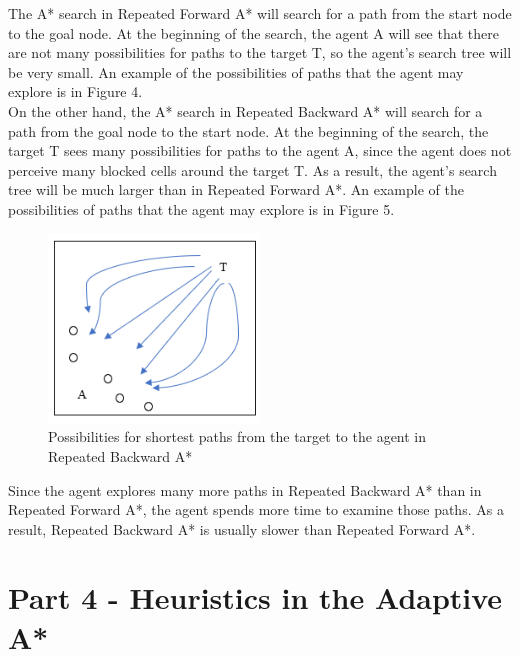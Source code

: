 \documentclass{article}
\begin{document}
The A* search in Repeated Forward A* will search for a path from the start node to the goal node. At the beginning of the search, the agent A will see that there are not many possibilities for paths to the target T, so the agent's search tree will be very small. An example of the possibilities of paths that the agent may explore is in Figure 4.\\



On the other hand, the A* search in Repeated Backward A* will search for a path from the goal node to the start node. At the beginning of the search, the target T sees many possibilities for paths to the agent A, since the agent does not perceive many blocked cells around the target T. As a result, the agent's search tree will be much larger than in Repeated Forward A*. An example of the possibilities of paths that the agent may explore is in Figure 5. \\
\begin{figure}[h!]
  \includegraphics[width=0.5\textwidth]{p3_2.png}
  \caption{Possibilities for shortest paths from the target to the agent in Repeated Backward A*}
\end{figure}

Since the agent explores many more paths in Repeated Backward A* than in Repeated Forward A*, the agent spends more time to examine those paths. As a result, Repeated Backward A* is usually slower than Repeated Forward A*.


\section{Part 4 - Heuristics in the Adaptive A*}
\end{document}
